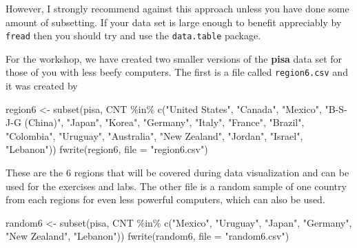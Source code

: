 \documentclass[
]{book}
\newenvironment{Shaded}{\begin{snugshade}}{\end{snugshade}}
\newcommand{\AttributeTok}[1]{\textcolor[rgb]{0.77,0.63,0.00}{#1}}
\newcommand{\FunctionTok}[1]{\textcolor[rgb]{0.00,0.00,0.00}{#1}}
\newcommand{\NormalTok}[1]{#1}
\newcommand{\OtherTok}[1]{\textcolor[rgb]{0.56,0.35,0.01}{#1}}
\newcommand{\SpecialCharTok}[1]{\textcolor[rgb]{0.00,0.00,0.00}{#1}}
\newcommand{\StringTok}[1]{\textcolor[rgb]{0.31,0.60,0.02}{#1}}
\begin{document}
However, I strongly recommend against this approach unless you have done some amount of subsetting. If your data set is large enough to benefit appreciably by \texttt{fread} then you should try and use the \texttt{data.table} package.

For the workshop, we have created two smaller versions of the \textbf{pisa} data set for those of you with less beefy computers. The first is a file called \texttt{region6.csv} and it was created by

\begin{Shaded}
\begin{Highlighting}[]
\NormalTok{region6 }\OtherTok{\textless{}{-}} \FunctionTok{subset}\NormalTok{(pisa, CNT }\SpecialCharTok{\%in\%}  \FunctionTok{c}\NormalTok{(}\StringTok{"United States"}\NormalTok{, }\StringTok{"Canada"}\NormalTok{, }\StringTok{"Mexico"}\NormalTok{,}
                                    \StringTok{"B{-}S{-}J{-}G (China)"}\NormalTok{, }\StringTok{"Japan"}\NormalTok{, }\StringTok{"Korea"}\NormalTok{,}
                                    \StringTok{"Germany"}\NormalTok{, }\StringTok{"Italy"}\NormalTok{, }\StringTok{"France"}\NormalTok{, }\StringTok{"Brazil"}\NormalTok{,}
                                    \StringTok{"Colombia"}\NormalTok{, }\StringTok{"Uruguay"}\NormalTok{, }\StringTok{"Australia"}\NormalTok{,}
                                    \StringTok{"New Zealand"}\NormalTok{, }\StringTok{"Jordan"}\NormalTok{, }\StringTok{"Israel"}\NormalTok{, }\StringTok{"Lebanon"}\NormalTok{))}
\FunctionTok{fwrite}\NormalTok{(region6, }\AttributeTok{file =} \StringTok{"region6.csv"}\NormalTok{)}
\end{Highlighting}
\end{Shaded}

These are the 6 regions that will be covered during data visualization and can be used for the exercises and labs. The other file is a random sample of one country from each regions for even less powerful computers, which can also be used.

\begin{Shaded}
\begin{Highlighting}[]
\NormalTok{random6 }\OtherTok{\textless{}{-}} \FunctionTok{subset}\NormalTok{(pisa, CNT }\SpecialCharTok{\%in\%}  \FunctionTok{c}\NormalTok{(}\StringTok{"Mexico"}\NormalTok{, }\StringTok{"Uruguay"}\NormalTok{, }\StringTok{"Japan"}\NormalTok{,}
                                    \StringTok{"Germany"}\NormalTok{, }\StringTok{"New Zealand"}\NormalTok{, }\StringTok{"Lebanon"}\NormalTok{))}
\FunctionTok{fwrite}\NormalTok{(random6, }\AttributeTok{file =} \StringTok{"random6.csv"}\NormalTok{)}
\end{Highlighting}
\end{Shaded}
\end{document}
